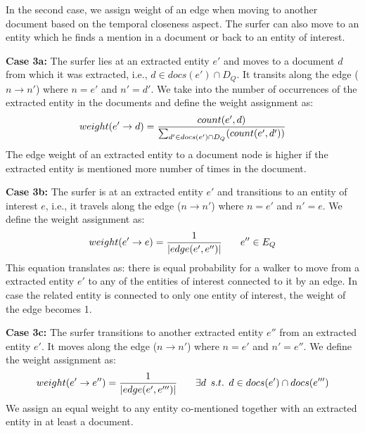 {\vspace{2mm}\noindent
In the second case, we assign weight of an edge when moving to another document based
on the temporal closeness aspect.
The surfer can also move to an entity which he finds a mention in a document or back to
an entity of interest.

\vspace{2mm}\noindent
{\bf Case 3a:} The surfer lies at an extracted entity $e'$ and
moves to a document $d$ from which it was extracted, i.e., $d \in docs(e') \cap D_Q $.
It transits along the edge ($n \rightarrow n'$) where $n=e'$ and $n'=d'$.
We take into the number of occurrences of the extracted entity in the documents
and define the weight assignment as:
\begin{equation}
\begin{split}
\small
weight(e' \rightarrow d) = \frac{count(e', d)}{\sum_{d' \in docs(e') \cap D_Q}(count(e',d'))}
\end{split}
\end{equation}
The edge weight of an extracted entity to a document node is higher if the extracted
entity is mentioned more number of times in the document.

\vspace{2mm}\noindent
{\bf Case 3b:} The surfer is at an extracted entity $e'$ and
transitions to an entity of interest $e$, i.e., it travels along the edge
($n \rightarrow n'$) where $n=e'$ and $n'=e$.
We define the weight assignment as:
\begin{equation}
\begin{split}
\small
weight(e' \rightarrow e) = \frac{1}{|edge(e', e'')|} \qquad e'' \in E_Q
\end{split}
\end{equation}
This equation translates as: there is equal probability for a
walker to move from a extracted entity $e'$ to any of the entities of interest
connected to it by an edge. In case the related entity is connected to only one
entity of interest, the weight of the edge becomes 1.


\vspace{2mm}\noindent
{\bf Case 3c:} The surfer transitions to another extracted entity $e''$ from an
extracted entity $e'$. It moves along the edge
($n \rightarrow n'$) where $n=e'$ and $n'=e''$.
We define the weight assignment as:
\begin{equation}
\begin{split}
\small
weight(e' \rightarrow e'') = \frac{1}{|edge(e', e''')|} \qquad \exists d \enskip
s.t. \enskip d \in docs(e') \cap docs(e''')
\end{split}
\end{equation}
We assign an equal weight to any entity co-mentioned together with an extracted entity
in at least a document.

}
